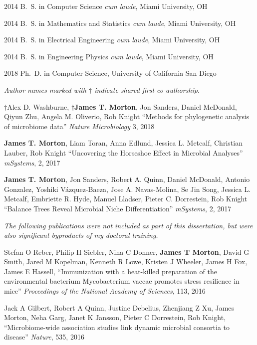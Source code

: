 \begin{frontmatter}
\begin{vitapage}
\begin{vita}
  \item[2014] B.~S. in Computer Science \emph{cum laude}, Miami University, OH
  \item[2014] B.~S. in Mathematics and Statistics \emph{cum laude}, Miami University, OH
  \item[2014] B.~S. in Electrical Engineering \emph{cum laude}, Miami University, OH
  \item[2014] B.~S. in Engineering Physics \emph{cum laude}, Miami University, OH
  \item[2018] Ph.~D. in Computer Science, University of California San Diego
\end{vita}
\begin{publications}
    \item \textsl{Author names marked with $\dagger$ indicate shared first co-authorship}.

    \item $\dagger$Alex D. Washburne, \textbf{$\dagger$James T. Morton}, Jon Sanders, Daniel McDonald, Qiyun Zhu, Angela M. Oliverio, Rob Knight  ``Methods for phylogenetic analysis of microbiome data'' \emph{Nature Microbiology} 3, 2018

    \item  \textbf{James T. Morton}, Liam Toran, Anna Edlund, Jessica L. Metcalf, Christian Lauber, Rob Knight ``Uncovering the Horseshoe Effect in Microbial Analyses'' \emph{mSystems}, 2, 2017

    \item \textbf{James T. Morton}, Jon Sanders, Robert A. Quinn, Daniel McDonald, Antonio Gonzalez, Yoshiki Vázquez-Baeza, Jose A. Navas-Molina, Se Jin Song, Jessica L. Metcalf, Embriette R. Hyde, Manuel Lladser, Pieter C. Dorrestein, Rob Knight ``Balance Trees Reveal Microbial Niche Differentiation'' \emph{mSystems}, 2, 2017

    \textsl{The following publications were not included as part of this dissertation, but were also significant byproducts of my doctoral training.}
\item  Stefan O Reber, Philip H  Siebler, Nina C  Donner, \textbf{James T Morton}, David G  Smith, Jared M  Kopelman, Kenneth R  Lowe, Kristen J  Wheeler, James H  Fox, James E  Hassell,  ``Immunization with a heat-killed preparation of the environmental bacterium Mycobacterium vaccae promotes stress resilience in mice'' \emph{Proceedings of the National Academy of Sciences}, 113, 2016

    \item  Jack A Gilbert, Robert A  Quinn, Justine  Debelius, Zhenjiang Z  Xu, James  Morton, Neha  Garg, Janet K  Jansson, Pieter C  Dorrestein, Rob  Knight,  ``Microbiome-wide association studies link dynamic microbial consortia to disease'' \emph{Nature}, 535, 2016


\end{publications}
\end{vitapage}
\end{frontmatter}
